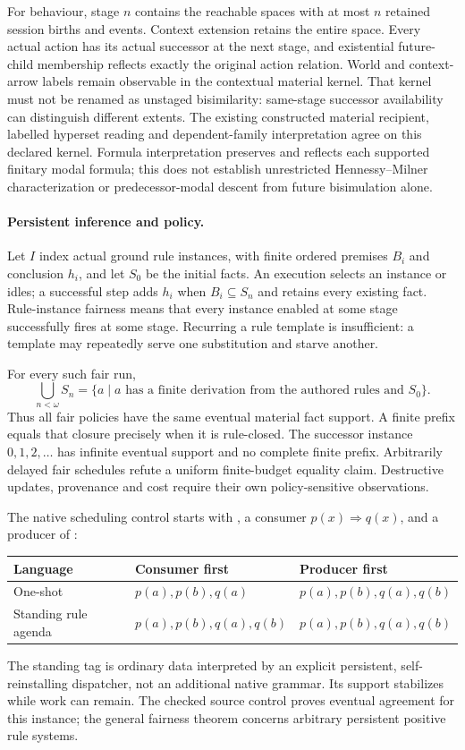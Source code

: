 \documentclass[10pt]{article}
\newcommand{\api}[1]{\texttt{\detokenize{#1}}}
\begin{document}
For behaviour, stage $n$ contains the reachable spaces with at most $n$
retained session births and events. Context extension retains the entire space.
Every actual action has its actual successor at the next stage, and existential
future-child membership reflects exactly the original action relation.
World and context-arrow labels remain observable in the contextual material
kernel. That kernel must not be renamed as unstaged bisimilarity: same-stage
successor availability can distinguish different extents.
The existing constructed material recipient, labelled hyperset reading and
dependent-family interpretation agree on this declared kernel. Formula
interpretation preserves and reflects each supported finitary modal formula;
this does not establish unrestricted Hennessy--Milner characterization or
predecessor-modal descent from future bisimulation alone.

\paragraph{Persistent inference and policy.}
Let $I$ index actual ground rule instances, with finite ordered premises
$B_i$ and conclusion $h_i$, and let $S_0$ be the initial facts. An execution
selects an instance or idles; a successful step adds $h_i$ when
$B_i\subseteq S_n$ and retains every existing fact. Rule-instance fairness
means that every instance enabled at some stage successfully fires at some
stage. Recurring a rule template is insufficient: a template may repeatedly
serve one substitution and starve another.

For every such fair run,
\[
  \bigcup_{n<\omega}S_n
    = \{a\mid a\text{ has a finite derivation from the authored rules and }S_0\}.
\]
Thus all fair policies have the same eventual material fact support.
A finite prefix equals that closure precisely when it is rule-closed.
The successor instance $0,1,2,\ldots$ has infinite eventual support and no
complete finite prefix. Arbitrarily delayed fair schedules refute a uniform
finite-budget equality claim. Destructive updates, provenance and cost require
their own policy-sensitive observations.

The native scheduling control starts with \api{(p a)}, a consumer
$p(x)\Rightarrow q(x)$, and a producer of \api{(p b)}:
\begin{center}
\begin{tabular}{@{}lll@{}}
\toprule
Language & Consumer first & Producer first \\
\midrule
One-shot \api{exec} & $p(a),p(b),q(a)$ & $p(a),p(b),q(a),q(b)$ \\
Standing rule agenda & $p(a),p(b),q(a),q(b)$ & $p(a),p(b),q(a),q(b)$ \\
\bottomrule
\end{tabular}
\end{center}
The standing tag is ordinary data interpreted by an explicit persistent,
self-reinstalling dispatcher, not an additional native grammar. Its support
stabilizes while work can remain. The checked source control proves eventual
agreement for this instance; the general fairness theorem concerns arbitrary
persistent positive rule systems.
\end{document}
